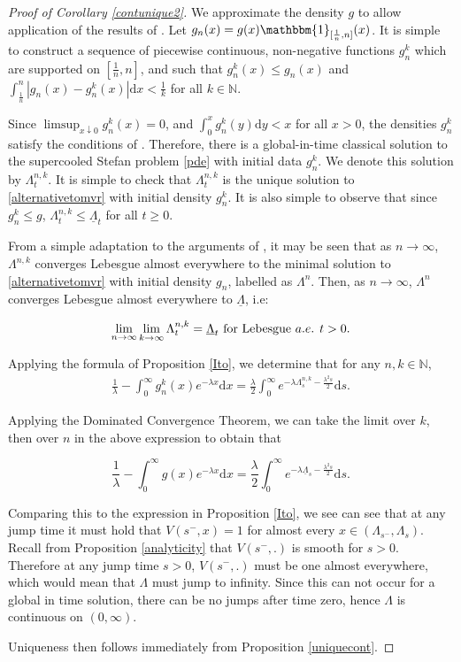 \documentclass[11pt]{article}
\theoremstyle{plain}
\theoremstyle{remark}
\theoremstyle{definition}
\numberwithin{equation}{section}
\begin{document}
\begin{proof}[Proof of Corollary \ref{contunique2}]
 We approximate the density $g$ to allow application of the results of \cite{PDEresult}. Let $g_n(x)=g(x)\mathbbm{1}_{[\frac{1}{n},n]}(x)$.
 It is simple to construct a sequence of piecewise continuous, non-negative functions $g_n^{k}$ which are supported on $[\frac{1}{n},n]$, and such that $g_n^k(x)\leq g_n(x)$ and $\int_{\frac{1}{n}}^n|g_n(x)- g_n^k(x)|\textrm{d}x<\frac{1}{k}$ for all $k\in\mathbb{N}$. 

Since $\limsup_{x\downarrow 0}g_n^{k}(x)=0$, and $\int_0^xg_n^{k}(y)\textrm{d}y<x$ for all $x>0$, the densities $g_n^k$ satisfy the conditions of 
\cite[Theorem 1.1]{PDEresult}. Therefore, there is a global-in-time classical solution to the supercooled Stefan problem \eqref{pde} with initial data $g_n^{k}$. We denote this solution by $\Lambda^{n,k}_t$. It is simple to check that ${\Lambda}^{n,k}_t$ is the unique solution to \eqref{alternativetomvr} with initial density $g_n^{k}$. 
It is also simple to observe that since $g_n^k\leq g$, $\Lambda_t^{n,k}\leq \underline{\Lambda}_t$ for all $t\geq 0$. 


From a simple adaptation to the arguments of \cite[Proposition 2.1]{minimal}, it may be seen that as $n\rightarrow\infty$, $\Lambda^{n,k}$ converges Lebesgue almost everywhere to the minimal solution to \eqref{alternativetomvr} with initial density $g_n$, labelled as $\Lambda^n$. Then, as $n\rightarrow\infty$, $\Lambda^n$ converges Lebesgue almost everywhere to $\underline{\Lambda}$, i.e:

$$\lim_{n\rightarrow\infty }\lim_{k\rightarrow\infty}{\Lambda}_t^{n,k}=\underline{\Lambda}_t \textrm{ for Lebesgue }a.e. \hspace{0.15cm} t>0.$$

Applying the formula of Proposition \ref{Ito}, we determine that for any $n,k\in \mathbb{N}$, 
\begin{align}\label{ito3}\frac{1}{\lambda}-\int_0^\infty g_n^k(x)e^{-\lambda x}\textrm{d}x=\frac{\lambda}{2}\int_0^\infty e^{-\lambda \Lambda^{n,k}_s-\frac{\lambda^2s}{2}}\textrm{d}s.\end{align}

Applying the Dominated Convergence Theorem, we can take the limit over $k$, then over $n$ in the above expression to obtain that

$$\frac{1}{\lambda}-\int_0^\infty g(x)e^{-\lambda x}\textrm{d}x=\frac{\lambda}{2}\int_0^\infty e^{-\lambda \underline{\Lambda}_s-\frac{\lambda^2s}{2}}\textrm{d}s.$$

Comparing this to the expression in Proposition \ref{Ito}, we see can see that at any jump time it must hold that $V(s^-,x)=1$ for almost every $x\in(\Lambda_{s^-},\Lambda_s)$. Recall from  Proposition \ref{analyticity} that $V(s^-,.)$ is smooth for $s>0$. Therefore at any jump time $s>0$, $V(s^-,.)$ must be one almost everywhere, which would mean that $\Lambda$ must jump to infinity. Since this can not occur for a global in time solution, there can be no jumps after time zero, hence $\Lambda$ is continuous on $(0,\infty)$. 

Uniqueness then follows immediately from  Proposition \ref{uniquecont}.
\end{proof}
\end{document}
